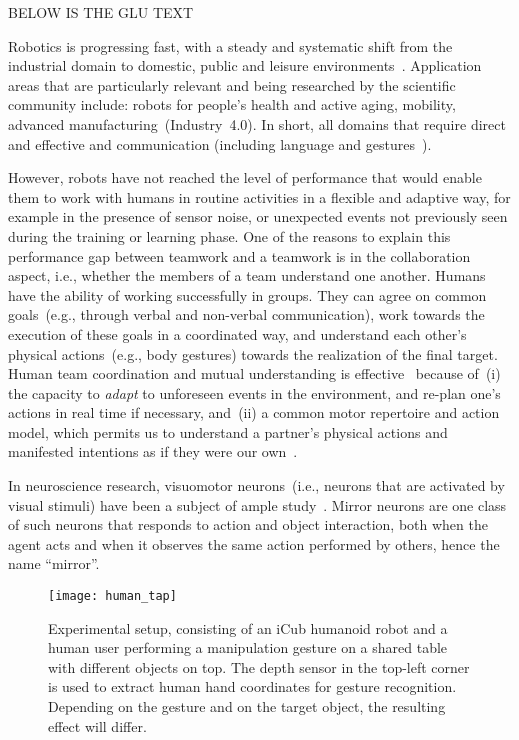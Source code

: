 BELOW IS THE GLU TEXT

Robotics is progressing fast, with a steady and systematic shift from the industrial domain to domestic, public and leisure environments~\cite[ch.~65, Domestic Robotics]{siciliano:2016:handbook2}. Application areas that are particularly relevant and being researched by the scientific community include: robots for people's health and active aging, mobility, advanced manufacturing~(Industry~4.0). In short, all domains that require direct and effective \hri{} and communication (including language and gestures~\cite{matuszek:2014:aaai}).

However, robots have not reached the level of performance that would enable them to work with humans in routine activities in a flexible and adaptive way, for example in the presence of sensor noise, or unexpected events not previously seen during the training or learning phase. One of the reasons to explain this performance gap between \hh{} teamwork and a \hr{} teamwork is in the collaboration aspect, i.e., whether the members of a team understand one another. Humans have the ability of working successfully in groups. They can agree on common goals~(e.g., through verbal and non-verbal communication), work towards the execution of these goals in a coordinated way, and understand each other's physical actions~(e.g., body gestures) towards the realization of the final target. Human team coordination and mutual understanding is effective~\cite{ramnani:2004:natureneuro} because of~(i) the capacity to \emph{adapt} to unforeseen events in the environment, and re-plan one's actions in real time if necessary, and~(ii) a common motor repertoire and action model, which permits us to understand a partner's physical actions and manifested intentions as if they were our own~\cite{saponaro:2013:crhri}.

In neuroscience research, visuomotor neurons~(i.e., neurons that are activated by visual stimuli) have been a subject of ample study~\cite{rizzolatti:2001:nrn}. Mirror neurons are one class of such neurons that responds to action and object interaction, both when the agent acts and when it observes the same action performed by others, hence the name ``mirror''.

\begin{figure}
  \centering
  \texttt{[image: human\_tap]}
  \caption{Experimental setup, consisting of an iCub humanoid robot and a human user performing a manipulation gesture on a shared table with different objects on top. The depth sensor in the top-left corner is used to extract human hand coordinates for gesture recognition. Depending on the gesture and on the target object, the resulting effect will differ.}
  \label{fig:experimental_setup}
\end{figure}

